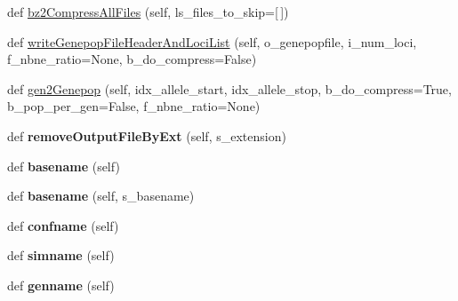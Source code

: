 \begin{DoxyCompactItemize}
\item 
def \hyperlink{classnegui_1_1pgoutputsimupop_1_1PGOutputSimuPop_a3046e1eac1fbd82acf47c0f7c0d06b70}{bz2\+Compress\+All\+Files} (self, ls\+\_\+files\+\_\+to\+\_\+skip=\mbox{[}$\,$\mbox{]})
\item 
def \hyperlink{classnegui_1_1pgoutputsimupop_1_1PGOutputSimuPop_a99bc161de61efea5751a230b9b4c9950}{write\+Genepop\+File\+Header\+And\+Loci\+List} (self, o\+\_\+genepopfile, i\+\_\+num\+\_\+loci, f\+\_\+nbne\+\_\+ratio=None, b\+\_\+do\+\_\+compress=False)
\item 
def \hyperlink{classnegui_1_1pgoutputsimupop_1_1PGOutputSimuPop_a97a29bbf73ef3b22a5de110d473611b6}{gen2\+Genepop} (self, idx\+\_\+allele\+\_\+start, idx\+\_\+allele\+\_\+stop, b\+\_\+do\+\_\+compress=True, b\+\_\+pop\+\_\+per\+\_\+gen=False, f\+\_\+nbne\+\_\+ratio=None)
\item 
def {\bfseries remove\+Output\+File\+By\+Ext} (self, s\+\_\+extension)\hypertarget{classnegui_1_1pgoutputsimupop_1_1PGOutputSimuPop_a27af4e615fcb17d2343dc27f614c1359}{}\label{classnegui_1_1pgoutputsimupop_1_1PGOutputSimuPop_a27af4e615fcb17d2343dc27f614c1359}

\item 
def {\bfseries basename} (self)\hypertarget{classnegui_1_1pgoutputsimupop_1_1PGOutputSimuPop_af67ba734fbe5d4240a8cef38e63586d1}{}\label{classnegui_1_1pgoutputsimupop_1_1PGOutputSimuPop_af67ba734fbe5d4240a8cef38e63586d1}

\item 
def {\bfseries basename} (self, s\+\_\+basename)\hypertarget{classnegui_1_1pgoutputsimupop_1_1PGOutputSimuPop_aafca25668d51a1beec732306b7973884}{}\label{classnegui_1_1pgoutputsimupop_1_1PGOutputSimuPop_aafca25668d51a1beec732306b7973884}

\item 
def {\bfseries confname} (self)\hypertarget{classnegui_1_1pgoutputsimupop_1_1PGOutputSimuPop_a67795b5f8245e4e921615ac4cc79a5be}{}\label{classnegui_1_1pgoutputsimupop_1_1PGOutputSimuPop_a67795b5f8245e4e921615ac4cc79a5be}

\item 
def {\bfseries simname} (self)\hypertarget{classnegui_1_1pgoutputsimupop_1_1PGOutputSimuPop_ac3e82333b61e2c3e9545c9ca8e9cf64c}{}\label{classnegui_1_1pgoutputsimupop_1_1PGOutputSimuPop_ac3e82333b61e2c3e9545c9ca8e9cf64c}

\item 
def {\bfseries genname} (self)\hypertarget{classnegui_1_1pgoutputsimupop_1_1PGOutputSimuPop_a43b4446563d323091900f8b6bcfd6044}{}\label{classnegui_1_1pgoutputsimupop_1_1PGOutputSimuPop_a43b4446563d323091900f8b6bcfd6044}


\end{DoxyCompactItemize}
